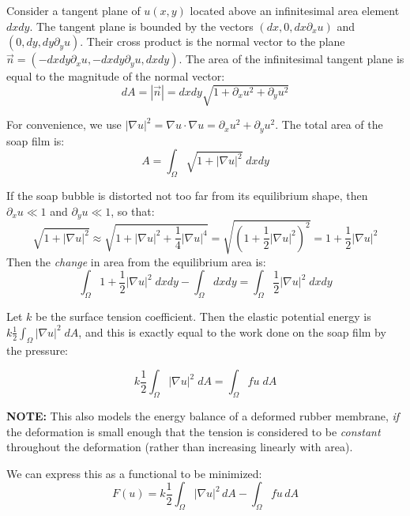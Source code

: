 \documentclass[a4paper]{report}
\begin{document}
Consider a tangent plane of $u(x,y)$ located above an infinitesimal area element $dxdy$.  The tangent plane is bounded by the vectors $(dx,0,dx \partial_x u)$ and $(0,dy,dy \partial_y u)$. Their cross product is the normal vector to the plane\\
 $\vec{n} = (-dxdy \partial_x u, -dxdy \partial_y u, dxdy) $. The area of the infinitesimal tangent plane is equal to the magnitude of the normal vector:
\begin{equation}
dA = |\vec{n}| = dxdy \sqrt{1 + \partial_x u^2 + \partial_y u^2}
\end{equation}

For convenience, we use $|\nabla u|^2 = \nabla u \cdot \nabla u = \partial_x u^2 + \partial_y u^2  $.  The total area of the soap film is:
\begin{equation}
A =  \int_{\Omega} \sqrt{1 + |\nabla u|^2} \;dxdy
\end{equation}

If the soap bubble is distorted not too far from its equilibrium shape, then $\partial_x u \ll 1$ and $\partial_y u \ll 1$, so that:
\begin{equation}
\sqrt{1 + |\nabla u|^2} \approx \sqrt{1 + |\nabla u|^2 + \frac{1}{4} |\nabla u|^4}
= \sqrt{(1 + \frac{1}{2} |\nabla u|^2)^2}
= 1 + \frac{1}{2} |\nabla u|^2
\end{equation}
Then the \emph{change} in area from the equilibrium area is:
\begin{equation}
\int_{\Omega} 1 + \frac{1}{2} |\nabla u|^2 \;dxdy - \int_{\Omega} dxdy = 
\int_{\Omega} \frac{1}{2} |\nabla u|^2 \;dxdy
\end{equation}

Let $k$ be the surface tension coefficient.  Then the elastic potential energy is $k \frac{1}{2} \int_{\Omega}  |\nabla u|^2 \;dA $, and this is exactly equal to the work done on the soap film by the pressure:

\begin{equation}
k \frac{1}{2} \int_{\Omega} |\nabla u|^2 \;dA = \int_{\Omega} f u \;dA
\end{equation}

\vspace{1em}
\textbf{NOTE:}  This also models the energy balance of a deformed rubber membrane, \emph{if} the deformation is small enough that the tension is considered to be \emph{constant} throughout the deformation (rather than increasing linearly with area).

\vspace{2em}
We can express this as a functional to be minimized:
\begin{equation}
F(u) =  k \frac{1}{2} \int_{\Omega} |\nabla u|^2 \,dA - \int_{\Omega} f u \,dA
\end{equation}
\end{document}
